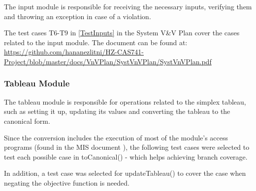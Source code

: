 \documentclass[12pt, titlepage]{article}
\begin{document}
The input module is responsible for receiving the necessary inputs, verifying 
them and throwing an exception in case of a violation.

The test cases T6-T9 in \ref{TestInputs} in the System V\&V Plan cover the 
cases related to the input module. The document can be found at: 
\url{https://github.com/hananezlitni/HZ-CAS741-Project/blob/master/docs/VnVPlan/SystVnVPlan/SystVnVPlan.pdf}

\subsubsection{Tableau Module}

The tableau module is responsible for operations related to the simplex 
tableau, such as setting it up, updating its values and converting the tableau 
to the canonical form. 

Since the conversion includes the execution of most of the module's access 
programs (found in the MIS document \cite{losms-mis}), the following test cases 
were selected to test each possible case in toCanonical() - which helps 
achieving branch coverage.

In addition, a test case was selected for updateTableau() to cover the case 
when negating the objective function is needed.
\end{document}

